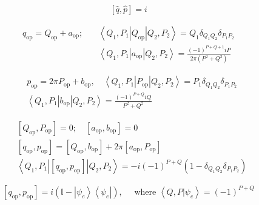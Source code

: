 \documentclass[main.tex]{subfiles}
\begin{document}
\begin{equation}\label{16.16}
	[\hat q, \hat p] = i
\end{equation}



\begin{equation}\label{16.18}
	\begin{aligned}
q_{\mathrm{op}}=Q_{\mathrm{op}}+a_{\mathrm{op}} ; \quad &\left\langle Q_{1}, P_{1}\left|Q_{\mathrm{op}}\right| Q_{2}, P_{2}\right\rangle= Q_{1} \delta_{Q_{1} Q_{2}} \delta_{P_{1} P_{2}} \\
&\left\langle Q_{1}, P_{1}\left|a_{\mathrm{op}}\right| Q_{2}, P_{2}\right\rangle=\frac{(-1)^{P+Q+1} i P}{2 \pi\left(P^{2}+Q^{2}\right)}
\end{aligned}
\end{equation}



\begin{equation}\label{16.19}
	\begin{aligned}
&p_{\mathrm{op}}=2 \pi P_{\mathrm{op}}+b_{\mathrm{op}}, \quad\left\langle Q_{1}, P_{1}\left|P_{\mathrm{op}}\right| Q_{2}, P_{2}\right\rangle= P_{1} \delta_{Q_{1} Q_{2}} \delta_{P_{1} P_{2}}\\
&\left\langle Q_{1}, P_{1}\left|b_{\mathrm{op}}\right| Q_{2}, P_{2}\right\rangle=\frac{(-1)^{P+Q} i Q}{P^{2}+Q^{2}}
\end{aligned}
\end{equation}



\begin{equation}\label{16.21}
	\begin{aligned}
&\left[Q_{\mathrm{op}}, P_{\mathrm{op}}\right]=0 ; \quad\left[a_{\mathrm{op}}, b_{\mathrm{op}}\right]=0\\
&\left[q_{\mathrm{op}}, p_{\mathrm{op}}\right]=\left[Q_{\mathrm{op}}, b_{\mathrm{op}}\right]+2 \pi\left[a_{\mathrm{op}}, P_{\mathrm{op}}\right]\\
&\left\langle Q_{1}, P_{1}\left|\left[q_{\mathrm{op}}, p_{\mathrm{op}}\right]\right| Q_{2}, P_{2}\right\rangle=- i(-1)^{P+Q}\left(1-\delta_{Q_{1} Q_{2}} \delta_{P_{1} P_{2}}\right)
\end{aligned}
\end{equation}



\begin{equation}\label{16.22}
	\left[q_{\mathrm{op}}, p_{\mathrm{op}}\right]=i\left(\mathbb{I}-\left|\psi_{e}\right\rangle\left\langle\psi_{e}\right|\right), \quad \text { where }\left\langle Q, P | \psi_{e}\right\rangle=(-1)^{P+Q}
\end{equation}
\end{document}
